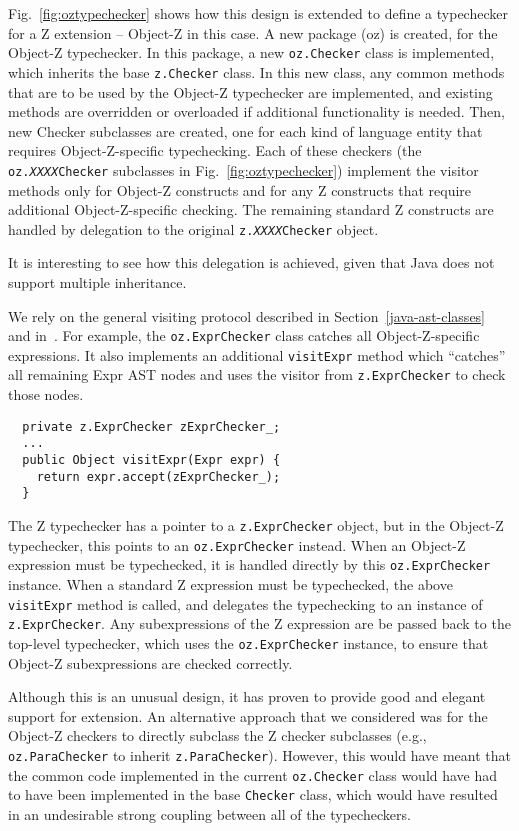 \documentclass{llncs}
\begin{document}
Fig.~\ref{fig:oztypechecker} shows how this design is extended to
define a typechecker for a Z extension -- Object-Z in this case.  A
new package (oz) is created, for the Object-Z typechecker.  In this
package, a new {\tt oz.Checker} class is implemented, which inherits
the base {\tt z.Checker} class.  In this new class, any common methods
that are to be used by the Object-Z typechecker are implemented, and
existing methods are overridden or overloaded if additional
functionality is needed.  Then, new Checker subclasses are created,
one for each kind of language entity that requires Object-Z-specific
typechecking.  Each of these checkers (the
\texttt{oz.\emph{XXXX}Checker} subclasses in
Fig.~\ref{fig:oztypechecker}) implement the visitor methods only for
Object-Z constructs and for any Z constructs that require additional
Object-Z-specific checking.  The remaining standard Z constructs are
handled by delegation to the original
\texttt{z.\emph{XXXX}Checker} object.

It is interesting to see how this delegation is achieved, given that
Java does not support multiple inheritance.

We rely on the general
visiting protocol described in Section~\ref{java-ast-classes} and
in~\cite{czt}.  For example, the \texttt{oz.ExprChecker} class catches
all Object-Z-specific expressions.  It also implements an additional 
\texttt{visitExpr} method which ``catches'' all remaining Expr AST
nodes and uses the visitor from \texttt{z.ExprChecker} to check those
nodes.  
\begin{verbatim}
  private z.ExprChecker zExprChecker_;
  ...
  public Object visitExpr(Expr expr) {
    return expr.accept(zExprChecker_);
  }
\end{verbatim}

The Z typechecker has a pointer to a \texttt{z.ExprChecker} object,
but in the Object-Z typechecker, this points to an \texttt{oz.ExprChecker}
instead.  When an Object-Z expression must be typechecked, it is handled
directly by this \texttt{oz.ExprChecker} instance.  When a standard Z
expression must be typechecked, the above \texttt{visitExpr} method
is called, and delegates the typechecking to an instance of 
\texttt{z.ExprChecker}.  Any subexpressions of the Z expression are
be passed back to the top-level typechecker, which uses the
\texttt{oz.ExprChecker} instance, to ensure that Object-Z subexpressions
are checked correctly.


Although this is an unusual design, it has proven to provide good
and elegant support for extension.  An alternative approach that we
considered was for the Object-Z checkers to directly subclass the Z
checker subclasses (e.g., \texttt{oz.ParaChecker} to inherit
\texttt{z.ParaChecker}).  However, this would have meant that the
common code implemented in the current
\texttt{oz.Checker} class would have had to have been
implemented in the base {\tt Checker} class, which would have resulted
in an undesirable strong coupling between all of the typecheckers.
\end{document}

